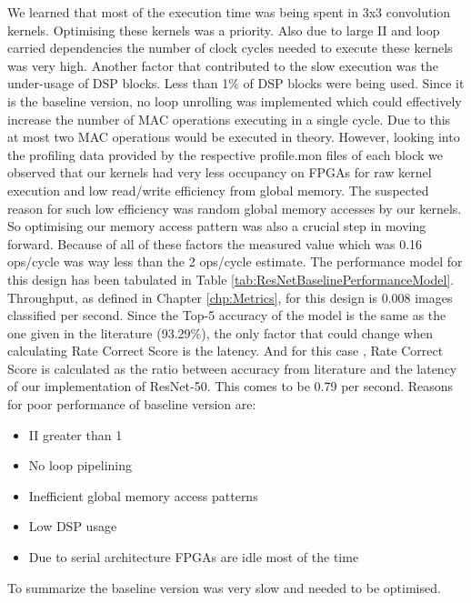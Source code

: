 We learned that most of the execution time was being spent in 3x3 convolution kernels. Optimising these kernels was a priority. Also due to large II and loop carried dependencies the number of clock cycles needed to execute these kernels was very high. Another factor that contributed to the slow execution was the under-usage of DSP blocks. Less than 1\% of DSP blocks were being used. Since it is the baseline version, no loop unrolling was implemented which could effectively increase the number of MAC operations executing in a single cycle. Due to this at most two MAC operations would be executed in theory. However, looking into the profiling data provided by the respective profile.mon files of each block we observed that our kernels had very less occupancy on FPGAs for raw kernel execution and low read/write efficiency from global memory. The suspected reason for such low efficiency was random global memory accesses by our kernels. So optimising our memory access pattern was also a crucial step in moving forward. Because of all of these factors the measured value which was 0.16 ops/cycle was way less than the 2 ops/cycle estimate. The performance model for this design has been tabulated in Table \ref{tab:ResNetBaselinePerformanceModel}.  
Throughput, as defined in Chapter \ref{chp:Metrics}, for this design is 0.008 images classified per second. Since  the Top-5 accuracy of the model is the same as the one given in the literature (93.29\%), the only factor that could change when calculating Rate Correct Score is the latency. And for this case , Rate Correct Score is calculated as the ratio between accuracy from literature and the latency of our implementation of ResNet-50. This comes to be  0.79 per second.
\newline
Reasons for poor performance of baseline version are:
\begin{itemize}
    \item II greater than 1 
    \item No loop pipelining
    \item Inefficient global memory access patterns
    \item Low DSP usage
    \item Due to serial architecture FPGAs are idle most of the time
\end{itemize}
To summarize the baseline version was very slow and needed to be optimised.

